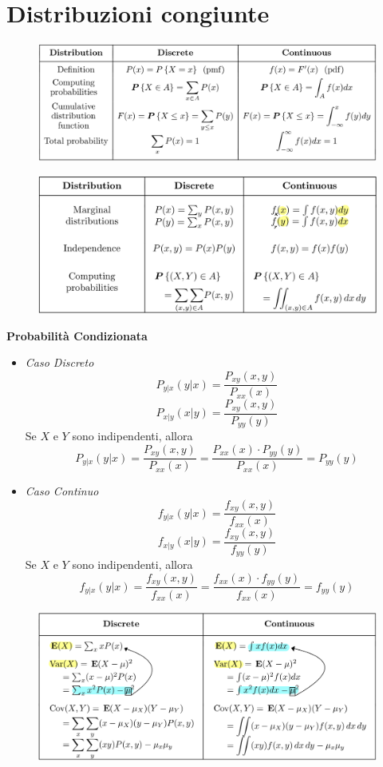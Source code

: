 \chapter{Distribuzioni congiunte}


\begin{figure}[h]
\begin{center}
\includegraphics[width=1\linewidth]{images/pmf_cdf.jpeg}
\end{center}
\end{figure}

\begin{figure}[h]
\begin{center}
\includegraphics[width=1\linewidth]{images/marginal.jpeg}
\end{center}
\end{figure}

\textbf{Probabilità Condizionata}
\begin{itemize}
    \item \textit{Caso Discreto}
    $$P_{y|x}(y|x) = \frac{P_{xy}(x,y)}{P_{xx}(x)}$$
    $$P_{x|y}(x|y) = \frac{P_{xy}(x,y)}{P_{yy}(y)}$$
    Se $X$ e $Y$ sono indipendenti, allora
    $$P_{y|x}(y|x) = \frac{P_{xy}(x,y)}{P_{xx}(x)} = \frac{P_{xx}(x) \cdot P_{yy}(y)}{P_{xx}(x)} = P_{yy}(y)$$
    \item \textit{Caso Continuo}
    $$f_{y|x}(y|x) = \frac{f_{xy}(x,y)}{f_{xx}(x)}$$
    $$f_{x|y}(x|y) = \frac{f_{xy}(x,y)}{f_{yy}(y)}$$
    Se $X$ e $Y$ sono indipendenti, allora
    $$f_{y|x}(y|x) = \frac{f_{xy}(x,y)}{f_{xx}(x)} = \frac{f_{xx}(x) \cdot f_{yy}(y)}{f_{xx}(x)} = f_{yy}(y)$$
\end{itemize}

\begin{figure}[h]
\begin{center}
\includegraphics[width=1\linewidth]{images/e_var_cov.jpeg}
\end{center}
\end{figure}